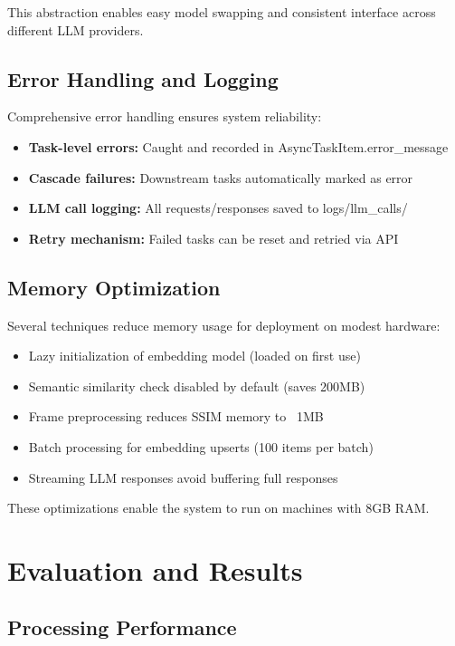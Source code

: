 \documentclass[12pt,a4paper]{article}
\begin{document}
This abstraction enables easy model swapping and consistent interface across different LLM providers.

\subsection{Error Handling and Logging}

Comprehensive error handling ensures system reliability:

\begin{itemize}
    \item \textbf{Task-level errors:} Caught and recorded in AsyncTaskItem.error\_message
    \item \textbf{Cascade failures:} Downstream tasks automatically marked as error
    \item \textbf{LLM call logging:} All requests/responses saved to logs/llm\_calls/
    \item \textbf{Retry mechanism:} Failed tasks can be reset and retried via API
\end{itemize}

\subsection{Memory Optimization}

Several techniques reduce memory usage for deployment on modest hardware:

\begin{itemize}
    \item Lazy initialization of embedding model (loaded on first use)
    \item Semantic similarity check disabled by default (saves 200MB)
    \item Frame preprocessing reduces SSIM memory to ~1MB
    \item Batch processing for embedding upserts (100 items per batch)
    \item Streaming LLM responses avoid buffering full responses
\end{itemize}

These optimizations enable the system to run on machines with 8GB RAM.

\newpage

\section{Evaluation and Results}
\label{sec:evaluation}

\subsection{Processing Performance}
\end{document}
